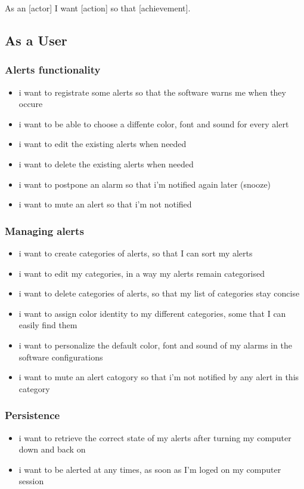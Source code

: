 As an [actor] I want [action] so that [achievement].

\subsection{As a User}
\subsubsection{Alerts functionality}
\begin{itemize}
	\item i want to registrate some alerts so that the software warns me when they occure
	\item i want to be able to choose a diffente color, font and sound for every alert
	\item i want to edit the existing alerts when needed
	\item i want to delete the existing alerts when needed
	\item i want to postpone an alarm so that i'm notified again later (snooze)
	\item i want to mute an alert so that i'm not notified
\end{itemize}
\subsubsection{Managing alerts}
\begin{itemize}
	\item i want to create categories of alerts, so that I can sort my alerts
	\item i want to edit my categories, in a way my alerts remain categorised
	\item i want to delete categories of alerts, so that my list of categories stay concise
	\item i want to assign color identity to my different categories, some that I can easily find them
	\item i want to personalize the default color, font and sound of my alarms in the software configurations
	\item i want to mute an alert catogory so that i'm not notified by any alert in this category
\end{itemize}
\subsubsection{Persistence}
\begin{itemize}
	\item i want to retrieve the correct state of my alerts after turning my computer down and back on
	\item i want to be alerted at any times, as soon as I'm loged on my computer session
\end{itemize}
